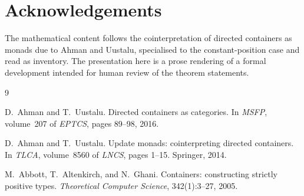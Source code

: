\documentclass[11pt,a4paper]{article}
\theoremstyle{plain}
\theoremstyle{definition}
\begin{document}
\section*{Acknowledgements}

The mathematical content follows the cointerpretation of directed
containers as monads due to Ahman and Uustalu, specialised to the
constant-position case and read as inventory. The presentation here is a
prose rendering of a formal development intended for human review of the
theorem statements.

\begin{thebibliography}{9}

D.~Ahman and T.~Uustalu.
\newblock Directed containers as categories.
\newblock In \emph{MSFP}, volume~207 of \emph{EPTCS}, pages 89--98, 2016.

D.~Ahman and T.~Uustalu.
\newblock Update monads: cointerpreting directed containers.
\newblock In \emph{TLCA}, volume~8560 of \emph{LNCS}, pages 1--15.
\newblock Springer, 2014.

M.~Abbott, T.~Altenkirch, and N.~Ghani.
\newblock Containers: constructing strictly positive types.
\newblock \emph{Theoretical Computer Science}, 342(1):3--27, 2005.

\end{thebibliography}
\end{document}
